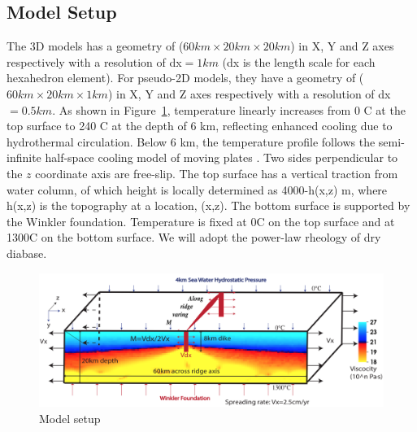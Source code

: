\subsection{Model Setup}

The 3D models has a geometry of ($60km \times 20km \times 20km$) in X, Y and Z axes respectively with a resolution of dx$=1km$ (dx is the length scale for each hexahedron element). For pseudo-2D models, they have a geometry of ($60km \times 20km \times 1km$) in X, Y and Z axes respectively with a resolution of dx$=0.5km$. As shown in Figure~\ref{fig_Methods8_1}, temperature linearly increases from 0 \degree C at the top surface to 240 \degree C at the depth of 6 km, reflecting enhanced cooling due to hydrothermal circulation. Below 6 km, the temperature profile follows the semi-infinite half-space cooling model of moving plates \citep[e.g.,][]{Turcotte2002}. Two sides perpendicular to the $z$ coordinate axis are free-slip. The top surface has a vertical traction from water column, of which height is locally determined as 4000-h(x,z) m, where h(x,z) is the topography at a location, (x,z). The bottom surface is supported by the Winkler foundation. Temperature is fixed at 0\degree C on the top surface and at 1300\degree C on the bottom surface. We will adopt the power-law rheology of dry diabase\citep[e.g.,][]{Kirby1987, Buck2005}. 

\begin{figure}[H]
 \centering
  \includegraphics[width=1.0\textwidth] {fig_Methods8_1.png}
 \caption{\small Model setup}
 \label{fig_Methods8_1}
\end{figure}


